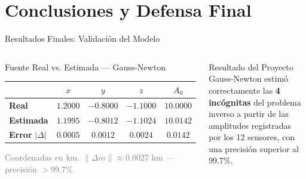 
\section{Conclusiones y Defensa Final}

\begin{frame}{Resultados Finales: Validación del Modelo}

    \begin{columns}[T]


        \begin{block}{Fuente Real vs. Estimada — Gauss-Newton}
            \centering
            \scriptsize
            \begin{tabular}{@{}lcccc@{}}
                \toprule
                & $x$ & $y$ & $z$ & $A_0$ \\ \midrule
                \textbf{Real}     & $1.2000$ & $-0.8000$ & $-1.1000$ & $10.0000$ \\[0.15cm]
                \textbf{Estimada} & $1.1995$ & $-0.8012$ & $-1.1024$ & $10.0142$ \\[0.15cm] \midrule
                \textbf{Error} $|\Delta|$ & $0.0005$ & $0.0012$ & $0.0024$ & $0.0142$ \\
                \bottomrule
            \end{tabular}
            \vspace{0.15cm}
            \tiny \textcolor{gray}{Coordenadas en km. $\|\Delta m\| \approx 0.0027$ km — precisión $> 99.7\%$}
        \end{block}

        \vspace{0.2cm}

        \begin{exampleblock}{Resultado del Proyecto}
            \scriptsize
            Gauss-Newton estimó correctamente las \textbf{4 incógnitas} del problema inverso a partir de las amplitudes registradas por los 12 sensores, con una precisión superior al 99.7\%.
        \end{exampleblock}



\end{columns}
\end{frame}
